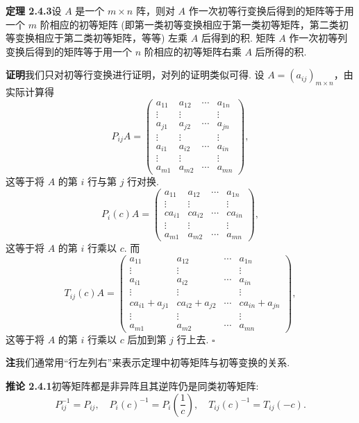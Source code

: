 \documentclass[UTF8,12pt,a4paper,fontset=fandol]{ctexart}
\begin{document}
\noindent\textbf{定理 2.4.3}\quad 设 $A$ 是一个 $m\times n$ 阵，则对 $A$ 作一次初等行变换后得到的矩阵等于用一个 $m$ 阶相应的初等矩阵 (即第一类初等变换相应于第一类初等矩阵，第二类初等变换相应于第二类初等矩阵，等等) 左乘 $A$ 后得到的积. 矩阵 $A$ 作一次初等列变换后得到的矩阵等于用一个 $n$ 阶相应的初等矩阵右乘 $A$ 后所得的积.

\noindent\textbf{证明}\quad 我们只对初等行变换进行证明，对列的证明类似可得. 设 $A=(a_{ij})_{m\times n}$，由实际计算得
\[
P_{ij}A=
\left(\begin{array}{cccc}
a_{11} & a_{12} & \cdots & a_{1n}\\
\vdots & \vdots & & \vdots\\
a_{j1} & a_{j2} & \cdots & a_{jn}\\
\vdots & \vdots & & \vdots\\
a_{i1} & a_{i2} & \cdots & a_{in}\\
\vdots & \vdots & & \vdots\\
a_{m1} & a_{m2} & \cdots & a_{mn}
\end{array}\right),
\]
这等于将 $A$ 的第 $i$ 行与第 $j$ 行对换.
\[
P_i(c)A=
\left(\begin{array}{cccc}
a_{11} & a_{12} & \cdots & a_{1n}\\
\vdots & \vdots & & \vdots\\
ca_{i1} & ca_{i2} & \cdots & ca_{in}\\
\vdots & \vdots & & \vdots\\
a_{m1} & a_{m2} & \cdots & a_{mn}
\end{array}\right),
\]
这等于将 $A$ 的第 $i$ 行乘以 $c$. 而
\[
T_{ij}(c)A=
\left(\begin{array}{cccc}
a_{11} & a_{12} & \cdots & a_{1n}\\
\vdots & \vdots & & \vdots\\
a_{i1} & a_{i2} & \cdots & a_{in}\\
\vdots & \vdots & & \vdots\\
ca_{i1}+a_{j1} & ca_{i2}+a_{j2} & \cdots & ca_{in}+a_{jn}\\
\vdots & \vdots & & \vdots\\
a_{m1} & a_{m2} & \cdots & a_{mn}
\end{array}\right),
\]
这等于将 $A$ 的第 $i$ 行乘以 $c$ 后加到第 $j$ 行上去. $\square$

\noindent\textbf{注}\quad 我们通常用“行左列右”来表示定理中初等矩阵与初等变换的关系.

\noindent\textbf{推论 2.4.1}\quad 初等矩阵都是非异阵且其逆阵仍是同类初等矩阵:
\[
P_{ij}^{-1}=P_{ij},\quad P_i(c)^{-1}=P_i\left(\frac{1}{c}\right),\quad T_{ij}(c)^{-1}=T_{ij}(-c).
\]
\end{document}
